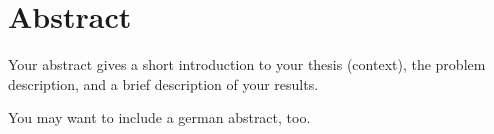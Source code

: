 \chapter*{Abstract}
	Your abstract gives a short introduction to your thesis (context), the problem description, and a brief description of your results.
	
	You may want to include a german abstract, too.